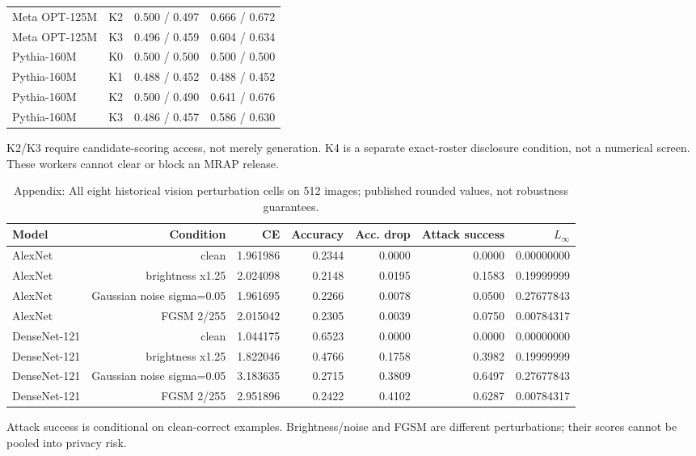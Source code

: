 {\begin{table}[t]
\begin{tabular}{lrrr}
Meta OPT-125M & K2 & 0.500 / 0.497 & 0.666 / 0.672 \\
Meta OPT-125M & K3 & 0.496 / 0.459 & 0.604 / 0.634 \\
Pythia-160M & K0 & 0.500 / 0.500 & 0.500 / 0.500 \\
Pythia-160M & K1 & 0.488 / 0.452 & 0.488 / 0.452 \\
Pythia-160M & K2 & 0.500 / 0.490 & 0.641 / 0.676 \\
Pythia-160M & K3 & 0.486 / 0.457 & 0.586 / 0.630 \\
\bottomrule
\end{tabular}
\par\smallskip
\begin{minipage}{\textwidth}\small K2/K3 require candidate-scoring access, not merely generation. K4 is a separate exact-roster disclosure condition, not a numerical screen. These workers cannot clear or block an MRAP release.\end{minipage}
\end{table}
\begin{table}[t]
\centering\small
\caption{Appendix: All eight historical vision perturbation cells on 512 images; published rounded values, not robustness guarantees.}
\label{tab:perturbations}
\begin{tabular}{lrrrrrr}
\toprule
Model & Condition & CE & Accuracy & Acc. drop & Attack success & $L_\infty$ \\
\midrule
AlexNet & clean & 1.961986 & 0.2344 & 0.0000 & 0.0000 & 0.00000000 \\
AlexNet & brightness x1.25 & 2.024098 & 0.2148 & 0.0195 & 0.1583 & 0.19999999 \\
AlexNet & Gaussian noise sigma=0.05 & 1.961695 & 0.2266 & 0.0078 & 0.0500 & 0.27677843 \\
AlexNet & FGSM 2/255 & 2.015042 & 0.2305 & 0.0039 & 0.0750 & 0.00784317 \\
DenseNet-121 & clean & 1.044175 & 0.6523 & 0.0000 & 0.0000 & 0.00000000 \\
DenseNet-121 & brightness x1.25 & 1.822046 & 0.4766 & 0.1758 & 0.3982 & 0.19999999 \\
DenseNet-121 & Gaussian noise sigma=0.05 & 3.183635 & 0.2715 & 0.3809 & 0.6497 & 0.27677843 \\
DenseNet-121 & FGSM 2/255 & 2.951896 & 0.2422 & 0.4102 & 0.6287 & 0.00784317 \\
\bottomrule
\end{tabular}
\par\smallskip
\begin{minipage}{\textwidth}\small Attack success is conditional on clean-correct examples. Brightness/noise and FGSM are different perturbations; their scores cannot be pooled into privacy risk.\end{minipage}

\end{table}}
